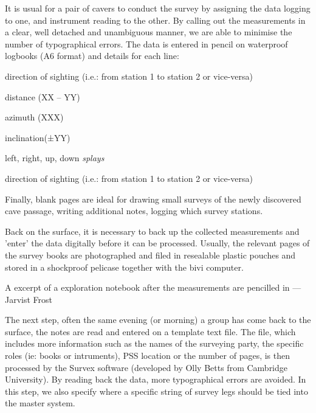It is usual for a pair of cavers to conduct the survey by assigning the data logging to one, and instrument reading to the other. By calling out the measurements in a clear, well detached and unambiguous manner, we are able to minimise the number of typographical errors. The data is entered in pencil on waterproof logbooks (A6 format) and details for each line:

\begin{citemize}
\item direction of sighting (i.e.: from station 1 to station 2 or vice-versa)
\item distance (XX – YY)
\item azimuth (XXX)
\item inclination(±YY)
\item left, right, up, down \emph{splays}
\item direction of sighting (i.e.: from station 1 to station 2 or vice-versa)
\end{citemize}

Finally, blank pages are ideal for drawing small surveys of the newly discovered cave passage, writing additional notes, logging which survey stations.

Back on the surface, it is necessary to back up the collected measurements and 'enter' the data digitally before it can be processed. Usually, the relevant pages of the survey books are photographed and filed in resealable plastic pouches and stored in a shockproof pelicase together with the bivi computer. 

\begin{marginfigure}
\checkoddpage \ifoddpage \forcerectofloat \else \forceversofloat \fi
\centering
 \caption{A excerpt of a exploration notebook after the measurements are pencilled in ---Jarvist Frost}
 \label{notebook}
\end{marginfigure}

The next step, often the same evening (or morning) a group has come back to the surface, the notes are read and entered on a template text file. The file, which includes more information such as the names of the surveying party, the specific roles (ie: books or intruments), PSS location or the number of pages, is then processed by the Survex software (developed by Olly Betts from Cambridge University). By reading back the data, more typographical errors are avoided. In this step, we also specify where a specific string of survey legs should be tied into the master system. 

